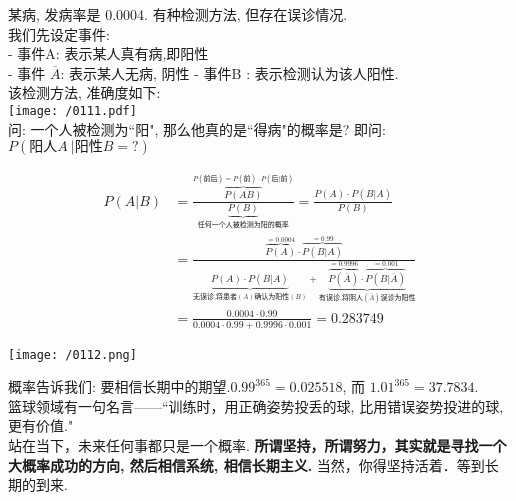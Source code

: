 \documentclass[UTF8]{ctexart}
\begin{document}
\vspace{1em} 




\begin{myEnvSample}
某病, 发病率是 0.0004. 有种检测方法, 但存在误诊情况. \\
我们先设定事件: \\
- 事件A: 表示某人真有病,即阳性 \\
- 事件 $\overline{A}$: 表示某人无病, 阴性 
- 事件B : 表示检测认为该人阳性. \\

该检测方法, 准确度如下: \\
\texttt{[image: /0111.pdf]} \\

问: 一个人被检测为``阳", 那么他真的是``得病"的概率是? 即问: $P(\text{阳人}A \ |\text{阳性}B=?)$ 

\begin{align*}  %
	P(A|B) &=\frac{\overset{P(\text{前后})=P(\text{前})\cdot P(\text{后|前})}{\overbrace{P\left( AB \right) }}}{\underset{\text{任何一个人被检测为阳的概率}}{\underbrace{P\left( B \right) }}}=\frac{P\left( A \right) \cdot P\left( B|A \right)}{P\left( B \right)}\\
&=\frac{\overset{=0.0004}{\overbrace{P\left( A \right) }}\cdot \overset{=0.99}{\overbrace{P\left( B|A \right) }}}{\underset{\text{无误诊,将患者}(A)\text{确认为阳性}(B)}{\underbrace{P\left( A \right) \cdot P\left( B|A \right) }}+\underset{\text{有误诊,将阴人}(\overline{A})\text{误诊为阳性}}{\underbrace{\overset{=0.9996}{\overbrace{P\left( \overline{A} \right) }}\cdot \overset{=0.001}{\overbrace{P\left( B|\overline{A} \right) }}}}}\\
&=\frac{0.0004\cdot 0.99}{0.0004\cdot 0.99+0.9996\cdot 0.001}=0.283749
\end{align*}


\texttt{[image: /0112.png]}

\end{myEnvSample}
\vspace{1em} 



概率告诉我们: 要相信长期中的期望.$0.99^{365}=0.025518$, 而 $ 1.01^{365}=37.7834$.   \\
篮球领域有一句名言——``训练时，用正确姿势投丢的球, 比用错误姿势投进的球, 更有价值." \\
站在当下，未来任何事都只是一个概率. \textbf{所谓坚持，所谓努力，其实就是寻找一个大概率成功的方向, 然后相信系统, 相信长期主义.} 当然，你得坚持活着．等到长期的到来.  \\
\end{document}
